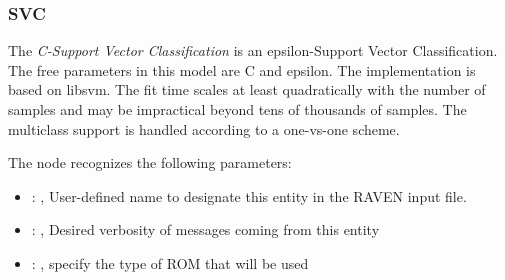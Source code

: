 \subsubsection{SVC}
  The  \textit{C-Support Vector Classification} is an epsilon-Support Vector
  Classification.                             The free parameters in this model are C and epsilon.
  The implementation is based on libsvm. The fit time scales at least
  quadratically with the number of samples and may be impractical                             beyond
  tens of thousands of samples. The multiclass support is handled according to a one-vs-one scheme.

  The  node recognizes the following parameters:
    \begin{itemize}
      \item {}: , 
        User-defined name to designate this entity in the RAVEN input file.
      \item {}: , 
        Desired verbosity of messages coming from this entity
      \item {}: , 
        specify the type of ROM that will be used
  \end{itemize}

